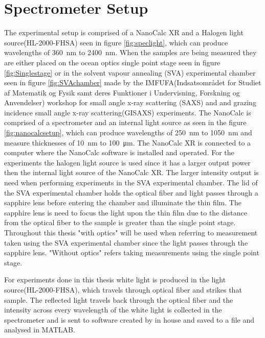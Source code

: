 \documentclass[MasterThesisMain.tex]{subfiles}
\begin{document}
\section{Spectrometer Setup}
The experimental setup is comprised of a NanoCalc XR and a Halogen light source(HL-2000-FHSA) seen in figure \ref{fig:speclight}, which can produce wavelengths of \SI{360}{\nano\meter} to \SI{2400}{\nano\meter}. When the samples are being measured they are either placed on the ocean optics single point stage seen in figure \ref{fig:Singlestage} or in the solvent vapour annealing (SVA) experimental chamber seen in figure \ref{fig:SVAchamber} made by the IMFUFA(Indsatsområdet for Studiet af Matematik og Fysik samt deres Funktioner i Undervisning, Forskning og Anvendelser) workshop for small angle x-ray scattering (SAXS) and and grazing incidence small angle x-ray scattering(GISAXS) experiments. The NanoCalc is comprised of a spectrometer and an internal light source as seen in the figure \ref{fig:nanocalcsetup}, which can produce wavelengths of \SI{250}{\nano\meter} to \SI{1050}{\nano\meter} and measure thicknesses of \SI{10}{\nano\meter} to \SI{100}{\micro\meter}. The NanoCalc XR is connected to a computer where the NanoCalc software is installed and operated. For the experiments the halogen light source is used since it has a larger output power then the internal light source of the NanoCalc XR. The larger intensity output is need when performing experiments in the SVA experimental chamber. The lid of the SVA experimental chamber holds the optical fiber and light passes through a sapphire lens before entering the chamber and illuminate the thin film. The sapphire lens is need to focus the light upon the thin film due to the distance from the optical fiber to the sample is greater than the single point stage. Throughout this thesis "with optics" will be used when referring to measurement taken using the SVA experimental chamber since the light passes through the sapphire lens. "Without optics" refers taking measurements using the single point stage.  

For experiments done in this thesis white light is produced in the light source(HL-2000-FHSA), which travels through optical fiber and strikes that sample. The reflected light travels back through the optical fiber and the intensity across every wavelength of the white light is collected in the spectrometer and is sent to software created by in house and saved to a file and analysed in MATLAB\textsuperscript{\textregistered}.  
	
\end{document}
